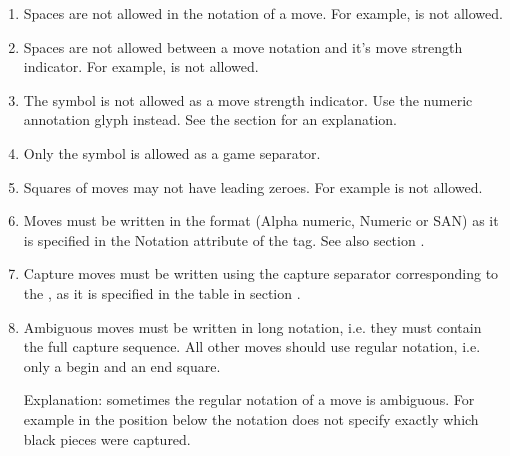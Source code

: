 \documentclass[letterpaper,10pt,english]{sphinxmanual}
\begin{document}
\begin{enumerate}
%
\item {} 
\sphinxAtStartPar
Spaces are not allowed in the notation of a move. For example,  is not allowed.

\item {} 
\sphinxAtStartPar
Spaces are not allowed between a move notation and it’s move strength indicator. For example,  is not allowed.

\item {} 
\sphinxAtStartPar
The symbol \sphinxcode{\sphinxupquote{*}} is not allowed as a move strength indicator. Use the  numeric annotation glyph instead.
See the {\hyperref[\detokenize{issues:issues-section}]{}} section for an explanation.

\item {} 
\sphinxAtStartPar
Only the symbol \sphinxcode{\sphinxupquote{*}} is allowed as a game separator.

\item {} 
\sphinxAtStartPar
Squares of moves may not have leading zeroes. For example  is not allowed.

\item {} 
\sphinxAtStartPar
Moves must be written in the format (Alpha numeric, Numeric or SAN) as it is specified in the Notation attribute of the
 tag. See also section {\hyperref[\detokenize{gametype:gametype-section}]{}}.

\item {} 
\sphinxAtStartPar
Capture moves must be written using the capture separator corresponding to the , as it is specified in the
table in section {\hyperref[\detokenize{gametype:gametype-section}]{}}.

\item {} 
\sphinxAtStartPar
Ambiguous moves must be written in long notation, i.e. they must contain the full capture sequence. All other moves
should use regular notation, i.e. only a begin and an end square.

\sphinxAtStartPar
Explanation: sometimes the regular notation of a move is ambiguous. For example in the position below the notation
 does not specify exactly which black pieces were captured.


\end{enumerate}
\end{document}
